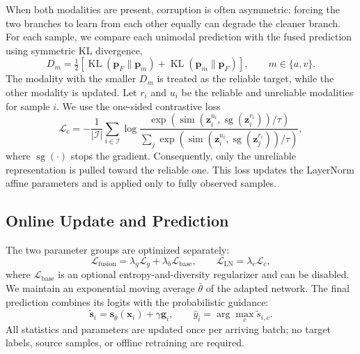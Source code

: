 When both modalities are present, corruption is often asymmetric: forcing the
two branches to learn from each other equally can degrade the cleaner branch.
For each sample, we compare each unimodal prediction with the fused prediction
using symmetric KL divergence,
\begin{equation}
  D_m=\tfrac{1}{2}\left[
  \operatorname{KL}(\bm p_F\|\bm p_m)+
  \operatorname{KL}(\bm p_m\|\bm p_F)\right],
  \qquad m\in\{a,v\}.
  \label{eq:reliability}
\end{equation}
The modality with the smaller $D_m$ is treated as the reliable target, while
the other modality is updated.  Let $r_i$ and $u_i$ be the reliable and
unreliable modalities for sample $i$.  We use the one-sided contrastive loss
\begin{equation}
  \mathcal{L}_{c}=-\frac{1}{|\mathcal{I}|}
  \sum_{i\in\mathcal{I}}
  \log\frac{
  \exp\!\left(\operatorname{sim}(\bm z_i^{u_i},
  \operatorname{sg}(\bm z_i^{r_i}))/\tau\right)}{
  \sum_j\exp\!\left(\operatorname{sim}(\bm z_i^{u_i},
  \operatorname{sg}(\bm z_j^{r_i}))/\tau\right)},
  \label{eq:contrastive}
\end{equation}
where $\operatorname{sg}(\cdot)$ stops the gradient.  Consequently, only the
unreliable representation is pulled toward the reliable one.  This loss
updates the LayerNorm affine parameters and is applied only to fully observed
samples.

\subsection{Online Update and Prediction}
\label{sec:optimization}

The two parameter groups are optimized separately:
\begin{equation}
  \mathcal{L}_{\mathrm{fusion}}=
  \lambda_g\mathcal{L}_g+\lambda_b\mathcal{L}_{\mathrm{base}},
  \qquad
  \mathcal{L}_{\mathrm{LN}}=\lambda_c\mathcal{L}_c,
  \label{eq:objective}
\end{equation}
where $\mathcal{L}_{\mathrm{base}}$ is an optional entropy-and-diversity
regularizer and can be disabled.  We maintain an exponential moving average
$\bar\theta$ of the adapted network.  The final prediction combines its logits
with the probabilistic guidance:
\begin{equation}
  \widetilde{\bm s}_i=\bm s_{\bar\theta}(\bm x_i)+\gamma\bm g_i,
  \qquad
  \widehat y_i=\arg\max_c\widetilde s_{i,c}.
  \label{eq:final_prediction}
\end{equation}
All statistics and parameters are updated once per arriving batch; no target
labels, source samples, or offline retraining are required.
